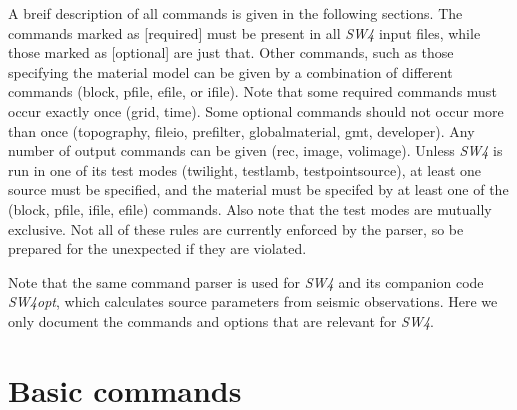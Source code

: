 \documentclass[11pt]{report}
\begin{document}
A breif description of all commands is given in the following sections. The commands marked as
[required] must be present in all \emph{SW4} input files, while those marked as [optional] are just
that. Other commands, such as those specifying the material model can be given by a combination of
different commands (block, pfile, efile, or ifile). Note that some required commands must occur
exactly once (grid, time). Some optional commands should not occur more than once (topography,
fileio, prefilter, globalmaterial, gmt, developer). Any number of output commands can
be given (rec, image, volimage). Unless \emph{SW4} is run in one of its test modes (twilight,
testlamb, testpointsource), at least one source must be specified, and the material must be specifed
by at least one of the (block, pfile, ifile, efile) commands. Also note that the test modes are
mutually exclusive. Not all of these rules are currently enforced by the parser, so be prepared for the
unexpected if they are violated.

Note that the same command parser is used for \emph{SW4} and its companion code \emph{SW4opt}, which
calculates source parameters from seismic observations. Here we only document the commands and options
that are relevant for \emph{SW4}.

\section{Basic commands}

\end{document}
